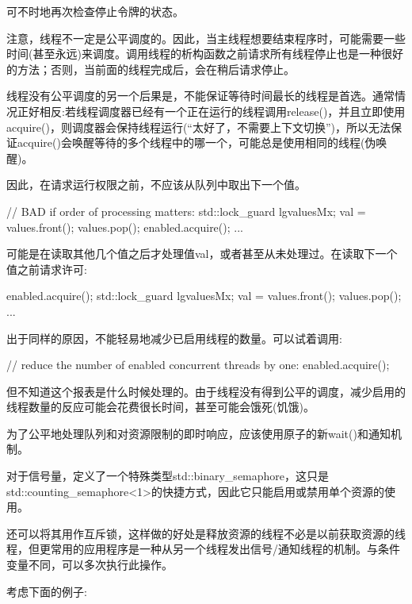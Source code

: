 可不时地再次检查停止令牌的状态。


注意，线程不一定是公平调度的。因此，当主线程想要结束程序时，可能需要一些时间(甚至永远)来调度。调用线程的析构函数之前请求所有线程停止也是一种很好的方法；否则，当前面的线程完成后，会在稍后请求停止。

线程没有公平调度的另一个后果是，不能保证等待时间最长的线程是首选。通常情况正好相反:若线程调度器已经有一个正在运行的线程调用release()，并且立即使用acquire()，则调度器会保持线程运行(“太好了，不需要上下文切换”)，所以无法保证acquire()会唤醒等待的多个线程中的哪一个，可能总是使用相同的线程(伪唤醒)。

因此，在请求运行权限之前，不应该从队列中取出下一个值。

\begin{cpp}
// BAD if order of processing matters:
{
	std::lock_guard lg{valuesMx};
	val = values.front();
	values.pop();
}
enabled.acquire();
...
\end{cpp}

可能是在读取其他几个值之后才处理值val，或者甚至从未处理过。在读取下一个值之前请求许可:

\begin{cpp}
enabled.acquire();
{
	std::lock_guard lg{valuesMx};
	val = values.front();
	values.pop();
}
...
\end{cpp}

出于同样的原因，不能轻易地减少已启用线程的数量。可以试着调用:

\begin{cpp}
// reduce the number of enabled concurrent threads by one:
enabled.acquire();
\end{cpp}

但不知道这个报表是什么时候处理的。由于线程没有得到公平的调度，减少启用的线程数量的反应可能会花费很长时间，甚至可能会饿死(饥饿)。

为了公平地处理队列和对资源限制的即时响应，应该使用原子的新wait()和通知机制。


对于信号量，定义了一个特殊类型std::binary\_semaphore，这只是std::counting\_semaphore<1>的快捷方式，因此它只能启用或禁用单个资源的使用。

还可以将其用作互斥锁，这样做的好处是释放资源的线程不必是以前获取资源的线程，但更常用的应用程序是一种从另一个线程发出信号/通知线程的机制。与条件变量不同，可以多次执行此操作。

考虑下面的例子:

